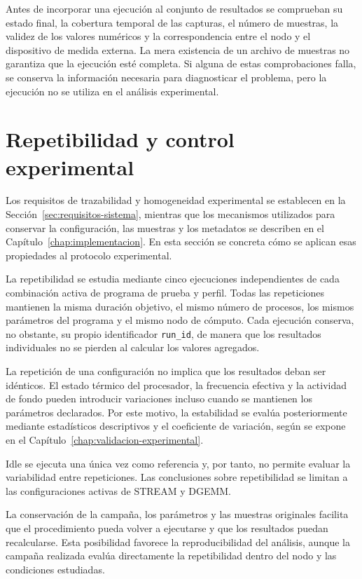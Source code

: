 Antes de incorporar una ejecución al conjunto de resultados se comprueban su estado final, la cobertura temporal de las capturas, el número de muestras, la validez de los valores numéricos y la correspondencia entre el nodo y el dispositivo de medida externa. La mera existencia de un archivo de muestras no garantiza que la ejecución esté completa. Si alguna de estas comprobaciones falla, se conserva la información necesaria para diagnosticar el problema, pero la ejecución no se utiliza en el análisis experimental.

\section{Repetibilidad y control experimental}
\label{sec:repetibilidad-diseno-experimental}

Los requisitos de trazabilidad y homogeneidad experimental se establecen en la Sección~\ref{sec:requisitos-sistema}, mientras que los mecanismos utilizados para conservar la configuración, las muestras y los metadatos se describen en el Capítulo~\ref{chap:implementacion}. En esta sección se concreta cómo se aplican esas propiedades al protocolo experimental.

La repetibilidad se estudia mediante cinco ejecuciones independientes de cada combinación activa de programa de prueba y perfil. Todas las repeticiones mantienen la misma duración objetivo, el mismo número de procesos, los mismos parámetros del programa y el mismo nodo de cómputo. Cada ejecución conserva, no obstante, su propio identificador \texttt{run\_id}, de manera que los resultados individuales no se pierden al calcular los valores agregados.

La repetición de una configuración no implica que los resultados deban ser idénticos. El estado térmico del procesador, la frecuencia efectiva y la actividad de fondo pueden introducir variaciones incluso cuando se mantienen los parámetros declarados. Por este motivo, la estabilidad se evalúa posteriormente mediante estadísticos descriptivos y el coeficiente de variación, según se expone en el Capítulo~\ref{chap:validacion-experimental}.

Idle se ejecuta una única vez como referencia y, por tanto, no permite evaluar la variabilidad entre repeticiones. Las conclusiones sobre repetibilidad se limitan a las configuraciones activas de STREAM y DGEMM.

La conservación de la campaña, los parámetros y las muestras originales facilita que el procedimiento pueda volver a ejecutarse y que los resultados puedan recalcularse. Esta posibilidad favorece la reproducibilidad del análisis, aunque la campaña realizada evalúa directamente la repetibilidad dentro del nodo y las condiciones estudiadas.
